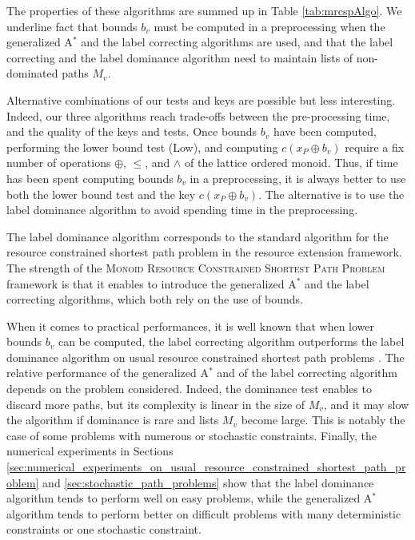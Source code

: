 \documentclass[11pt]{amsart}
\theoremstyle{plain}
\theoremstyle{remark}
\newcommand{\MRCSP}{\textsc{Monoid Resource Constrained Shortest Path Problem}\xspace}
\newcommand{\rplus}{\oplus}
\newcommand{\rleq}{\leqslant}
\newcommand{\re}{x}
\newcommand{\meet}{\wedge} \newcommand{\bigmeet}{\bigwedge}
\begin{document}
The properties of these algorithms are summed up in Table \ref{tab:mrcspAlgo}. We underline fact that bounds $b_{v}$ must be computed in a preprocessing when the generalized A$^{*}$ and the label correcting algorithms are used, and that the label correcting and the label dominance algorithm need to maintain lists of non-dominated paths $M_{v}$. 

Alternative combinations of our tests and keys are possible but less interesting. Indeed, our three algorithms reach trade-offs between the pre-processing time, and the quality of the keys and tests. Once bounds $b_{v}$ have been computed, performing the lower bound test (Low), and computing $c(\re_{P}\rplus b_{v})$ require a fix number of operations $\rplus$, $\rleq$, and $\meet$ of the lattice ordered monoid. Thus, if time has been spent computing bounds $b_{v}$ in a preprocessing, it is always better to use both the lower bound test and the key $c(\re_{P}\rplus b_{v})$. The alternative is to use the label dominance algorithm to avoid spending time in the preprocessing. 

The label dominance algorithm corresponds to the standard algorithm for the resource constrained shortest path problem \cite{irnich2005shortest} in the resource extension framework. The strength of the \MRCSP framework is that it enables to introduce the generalized A$^{*}$ and the label correcting algorithms, which both rely on the use of bounds.

When it comes to practical performances, it is well known that when lower bounds $b_{v}$ can be computed, the label correcting algorithm outperforms the label dominance algorithm on usual resource constrained shortest path problems \cite{dumitrescu2003improved}. The relative performance of the generalized A$^{*}$ and of the label correcting algorithm depends on the problem considered. Indeed, the dominance test enables to discard more paths, but its complexity is linear in the size of $M_{v}$, and it may slow the algorithm if dominance is rare and lists $M_{v}$ become large. This is notably the case of some problems with numerous or stochastic constraints. Finally, the numerical experiments in Sections \ref{sec:numerical_experiments_on_usual_resource_constrained_shortest_path_problem} and \ref{sec:stochastic_path_problems} show that the label dominance algorithm tends to perform well on easy problems, while the generalized A$^{*}$ algorithm tends to perform better on difficult problems with many deterministic constraints or one stochastic constraint.
\end{document}
